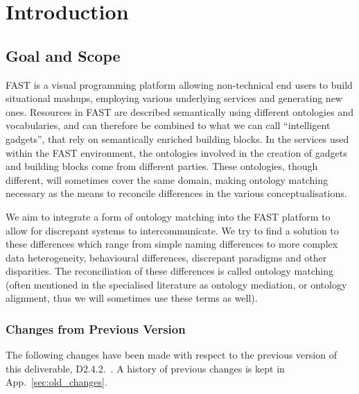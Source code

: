 \documentclass{fast_latex}
\begin{document}
\clearpage
{}


\section{Introduction} %
\label{sec:intro}
\subsection{Goal and Scope}
FAST is a visual programming platform allowing non-technical end users to build situational mashups, employing various underlying services and generating new ones. Resources in FAST are described semantically using different ontologies and vocabularies, and can therefore be combined to what we can call ``intelligent gadgets'', that rely on semantically enriched building blocks. In the services used within the FAST environment, the ontologies involved in the creation of gadgets and building blocks come from different parties. These ontologies, though different, will sometimes cover the same domain, making ontology matching necessary as the means to reconcile differences in the various conceptualisations.

We aim to integrate a form of ontology matching into the FAST platform to allow for discrepant systems to intercommunicate.  We try to find a solution to these differences which range from simple naming differences to more complex data heterogeneity, behavioural differences, discrepant paradigms and other disparities. The reconciliation of these differences is called ontology matching (often mentioned in the specialised literature as ontology mediation, or ontology alignment, thus we will sometimes use these terms as well). 

\subsubsection{Changes from Previous Version}

The following changes have been made with respect to the previous version of this deliverable, D2.4.2.~\cite{ambrus2010mediation}. A history of previous changes is kept in App.~\ref{sec:old_changes}.
\end{document}
